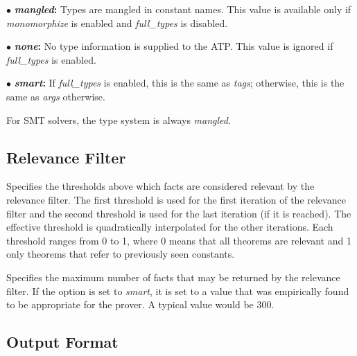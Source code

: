 \documentclass[a4paper,12pt]{article}
\begin{document}
\begin{enum}
\begin{enum}
\item[$\bullet$] \textbf{\textit{mangled}:} Types are mangled in constant names.
This value is available only if \textit{monomorphize} is enabled and
\textit{full\_types} is disabled.

\item[$\bullet$] \textbf{\textit{none}:} No type information is supplied to the
ATP. This value is ignored if \textit{full\_types} is enabled.

\item[$\bullet$] \textbf{\textit{smart}:} If \textit{full\_types} is enabled,
this is the same as \textit{tags}; otherwise, this is the
same as \textit{args} otherwise.
\end{enum}

For SMT solvers, the type system is always \textit{mangled}.
\end{enum}

\subsection{Relevance Filter}
\label{relevance-filter}

\begin{enum}
Specifies the thresholds above which facts are considered relevant by the
relevance filter. The first threshold is used for the first iteration of the
relevance filter and the second threshold is used for the last iteration (if it
is reached). The effective threshold is quadratically interpolated for the other
iterations. Each threshold ranges from 0 to 1, where 0 means that all theorems
are relevant and 1 only theorems that refer to previously seen constants.

Specifies the maximum number of facts that may be returned by the relevance
filter. If the option is set to \textit{smart}, it is set to a value that was
empirically found to be appropriate for the prover. A typical value would be
300.

\end{enum}

\subsection{Output Format}
\label{output-format}
\end{document}
